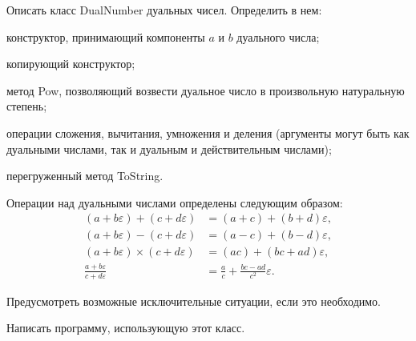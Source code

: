 Описать класс DualNumber дуальных чисел. Определить в нем:
\begin{itemize*}
\item конструктор, принимающий компоненты $a$ и $b$ дуального числа;
\item копирующий конструктор;
\item метод Pow, позволяющий возвести дуальное число в произвольную
  натуральную степень;
\item операции сложения, вычитания, умножения и деления (аргументы
  могут быть как дуальными числами, так и дуальным и действительным
  числами);
\item перегруженный метод ToString.
\end{itemize*}

Операции над дуальными числами определены следующим образом:
\begin{align*}
  (a+b\varepsilon) + (c+d\varepsilon) &= (a+c) + (b+d)\varepsilon,\\
  (a+b\varepsilon) - (c+d\varepsilon) &= (a-c) + (b-d)\varepsilon,\\
  (a+b\varepsilon) \times (c+d\varepsilon) &= (ac) + (bc+ad)\varepsilon,\\
  \frac{a+b\varepsilon}{c+d\varepsilon} &=
  \frac{a}{c} + \frac{bc-ad}{c^2}\varepsilon.
\end{align*}

Предусмотреть возможные исключительные ситуации, если это необходимо.

Написать программу, использующую этот класс.
